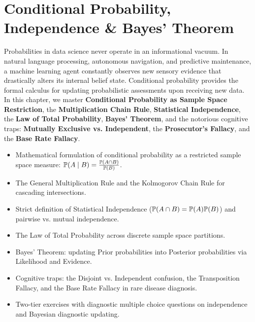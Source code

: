 \chapter{Conditional Probability, Independence \& Bayes' Theorem}

Probabilities in data science never operate in an informational vacuum. In natural language processing, autonomous navigation, and predictive maintenance, a machine learning agent constantly observes new sensory evidence that drastically alters its internal belief state. Conditional probability provides the formal calculus for updating probabilistic assessments upon receiving new data. In this chapter, we master \textbf{Conditional Probability as Sample Space Restriction}, the \textbf{Multiplication Chain Rule}, \textbf{Statistical Independence}, the \textbf{Law of Total Probability}, \textbf{Bayes' Theorem}, and the notorious cognitive traps: \textbf{Mutually Exclusive vs. Independent}, the \textbf{Prosecutor's Fallacy}, and the \textbf{Base Rate Fallacy}.

\vspace{0.5cm}
\begin{tcolorbox}[colback=primarylight, colframe=primarydark, title={\textbf{What You'll Learn in this Chapter}}]
\begin{itemize}
    \item Mathematical formulation of conditional probability as a restricted sample space measure: $\P(A \mid B) = \frac{\P(A \cap B)}{\P(B)}$.
    \item The General Multiplication Rule and the Kolmogorov Chain Rule for cascading intersections.
    \item Strict definition of Statistical Independence ($\P(A \cap B) = \P(A)\P(B)$) and pairwise vs. mutual independence.
    \item The Law of Total Probability across discrete sample space partitions.
    \item Bayes' Theorem: updating Prior probabilities into Posterior probabilities via Likelihood and Evidence.
    \item Cognitive traps: the Disjoint vs. Independent confusion, the Transposition Fallacy, and the Base Rate Fallacy in rare disease diagnosis.
    \item Two-tier exercises with diagnostic multiple choice questions on independence and Bayesian diagnostic updating.
\end{itemize}
\end{tcolorbox}

